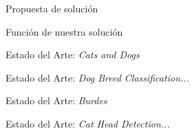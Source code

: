 \documentclass{beamer}
\begin{document}
	\begin{frame}{Propuesta de solución}
	\end{frame}
	\begin{frame}{Función de nuestra solución}
	\end{frame}

    \begin{frame}{Estado del Arte: \emph{Cats and Dogs}}
	\end{frame}

    \begin{frame}{Estado del Arte: \emph{Dog Breed Classification...}}
	\end{frame}

    \begin{frame}{Estado del Arte: \emph{Burdes}}
    \end{frame}

    \begin{frame}{Estado del Arte: \emph{Cat Head Detection...}}
    \end{frame}
\end{document}
